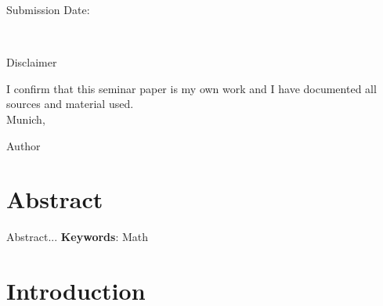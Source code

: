 \documentclass[12pt,letterpaper]{article}
\begin{document}
\begin{center}
\begin{large}
Submission Date: \date{\today} \\
\end{large}
\end{center}

\vspace{1,5cm}
\cleardoublepage{}
\thispagestyle{empty}
\vspace*{0.8\textheight}
\noindent
\makeatletter
\begin{center}
{\normalfont\bfseries} Disclaimer
\end{center}
\begin{flushleft}
I confirm that this seminar paper is my own work and I have documented all sources and material used.\\
\makeatother
\vspace{15mm}
\noindent
Munich, \date{\today} \hspace{50mm} Author
\end{flushleft}
\cleardoublepage{}


\section*{Abstract}
Abstract...
\textbf{Keywords}: Math

\newpage
\tableofcontents
\newpage

\setcounter{page}{1}
\pagestyle{fancy}
\fancyhf{}
\fancyhead[R]{\thepage}
\renewcommand{\headrulewidth}{0pt} %

\section{Introduction}
\end{document}
